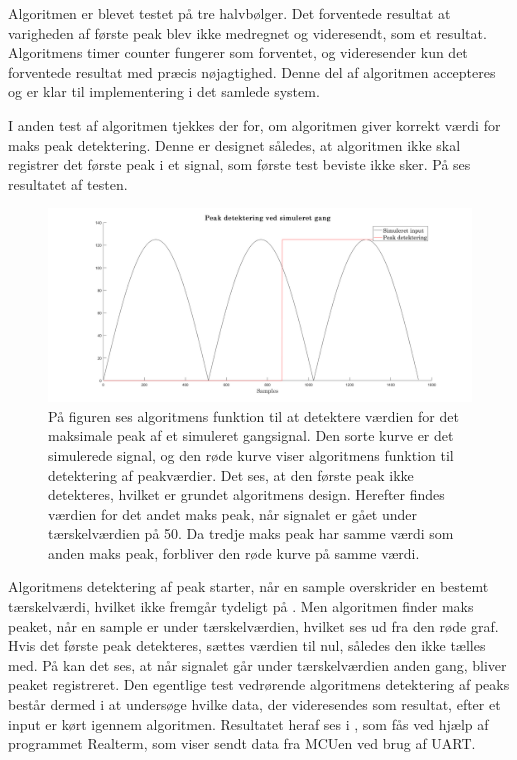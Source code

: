 Algoritmen er blevet testet på tre halvbølger. Det forventede resultat at varigheden af første peak blev ikke medregnet og videresendt, som et resultat. Algoritmens timer counter fungerer som forventet, og videresender kun det forventede resultat med præcis nøjagtighed. Denne del af algoritmen accepteres og er klar til implementering i det samlede system.

I anden test af algoritmen tjekkes der for, om algoritmen giver korrekt værdi for maks peak detektering. Denne er designet således, at algoritmen ikke skal registrer det første peak i et signal, som første test beviste ikke sker. På  ses resultatet af testen.
\begin{figure}[H]
	\centering
	\includegraphics[width=.9\textwidth]{figures/cDesign/test_peak_gang.png}
	\caption{På figuren ses algoritmens funktion til at detektere værdien for det maksimale peak af et simuleret gangsignal. Den sorte kurve er det simulerede signal, og den røde kurve viser algoritmens funktion til detektering af peakværdier. Det ses, at den første peak ikke detekteres, hvilket er grundet algoritmens design. Herefter findes værdien for det andet maks peak, når signalet er gået under tærskelværdien på 50. Da tredje maks peak har samme værdi som anden maks peak, forbliver den røde kurve på samme værdi.}
	\label{fig:test_peak_gang}
\end{figure}\vspace{-0.25cm}
Algoritmens detektering af peak starter, når en sample overskrider en bestemt tærskelværdi, hvilket ikke fremgår tydeligt på . Men algoritmen finder maks peaket, når en sample er under tærskelværdien, hvilket ses ud fra den røde graf. Hvis det første peak detekteres, sættes værdien til nul, således den ikke tælles med. På  kan det ses, at når signalet går under tærskelværdien anden gang, bliver peaket registreret. Den egentlige test vedrørende algoritmens detektering af peaks består dermed i at undersøge hvilke data, der videresendes som resultat, efter et input er kørt igennem algoritmen. Resultatet heraf ses i , som fås ved hjælp af programmet Realterm, som viser sendt data fra MCUen ved brug af UART.
